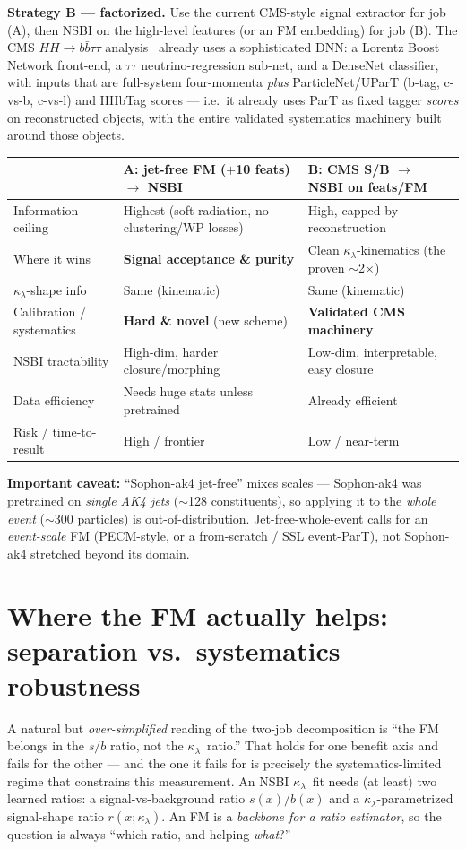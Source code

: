 \documentclass[11pt]{article}
\newcommand{\kl}{\ensuremath{\kappa_\lambda}}
\newcommand{\bbtt}{\ensuremath{b\bar b\tau\tau}}
\begin{document}
\textbf{Strategy B --- factorized.} Use the current CMS-style signal extractor for
job (A), then NSBI on the high-level features (or an FM embedding) for job (B). The
CMS $HH\to\bbtt$ analysis~\cite{cmsbbtt} already uses a sophisticated DNN: a Lorentz
Boost Network front-end, a $\tau\tau$ neutrino-regression sub-net, and a DenseNet
classifier, with inputs that are full-system four-momenta \emph{plus}
ParticleNet/UParT (b-tag, c-vs-b, c-vs-l) and HHbTag scores --- i.e.\ it already uses
ParT as fixed tagger \emph{scores} on reconstructed objects, with the entire
validated systematics machinery built around those objects.

\begin{table}[h]
\centering\small
\begin{tabular}{@{}p{}p{}p{}@{}}
\toprule
 & \textbf{A: jet-free FM ($+$10 feats) $\to$ NSBI} & \textbf{B: CMS S/B $\to$ NSBI on feats/FM} \\
\midrule
Information ceiling & Highest (soft radiation, no clustering/WP losses) & High, capped by reconstruction \\
Where it wins & \textbf{Signal acceptance \& purity} & Clean \kl-kinematics (the proven $\sim$2$\times$) \\
\kl-shape info & Same (kinematic) & Same (kinematic) \\
Calibration / systematics & \textbf{Hard \& novel} (new scheme) & \textbf{Validated CMS machinery} \\
NSBI tractability & High-dim, harder closure/morphing & Low-dim, interpretable, easy closure \\
Data efficiency & Needs huge stats unless pretrained & Already efficient \\
Risk / time-to-result & High / frontier & Low / near-term \\
\bottomrule
\end{tabular}
\end{table}

\noindent\textbf{Important caveat:} ``Sophon-ak4 jet-free'' mixes scales ---
Sophon-ak4 was pretrained on \emph{single AK4 jets} ($\sim$128 constituents), so
applying it to the \emph{whole event} ($\sim$300 particles) is out-of-distribution.
Jet-free-whole-event calls for an \emph{event-scale} FM (PECM-style, or a from-scratch
/ SSL event-ParT), not Sophon-ak4 stretched beyond its domain.

\section{Where the FM actually helps: separation vs.\ systematics robustness}
\label{sec:axes}
A natural but \emph{over-simplified} reading of the two-job decomposition is ``the FM
belongs in the $s/b$ ratio, not the \kl\ ratio.'' That holds for one benefit axis and
fails for the other --- and the one it fails for is precisely the systematics-limited
regime that constrains this measurement. An NSBI \kl\ fit needs (at least) two learned
ratios: a signal-vs-background ratio $s(x)/b(x)$ and a \kl-parametrized signal-shape
ratio $r(x;\kl)$. An FM is a \emph{backbone for a ratio estimator}, so the question is
always ``which ratio, and helping \emph{what}?''
\end{document}
